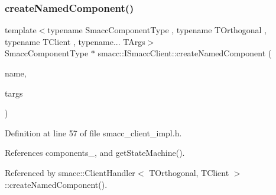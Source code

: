 \subsubsection{\texorpdfstring{create\+Named\+Component()}{createNamedComponent()}}
{\footnotesize\ttfamily template$<$typename Smacc\+Component\+Type , typename T\+Orthogonal , typename T\+Client , typename... T\+Args$>$ \\
Smacc\+Component\+Type $\ast$ smacc\+::\+I\+Smacc\+Client\+::create\+Named\+Component (\begin{DoxyParamCaption}\item[{std\+::string}]{name,  }\item[{T\+Args...}]{targs }\end{DoxyParamCaption})\hspace{0.3cm}{\ttfamily [protected]}}



Definition at line 57 of file smacc\+\_\+client\+\_\+impl.\+h.



References components\+\_\+, and get\+State\+Machine().



Referenced by smacc\+::\+Client\+Handler$<$ T\+Orthogonal, T\+Client $>$\+::create\+Named\+Component().


